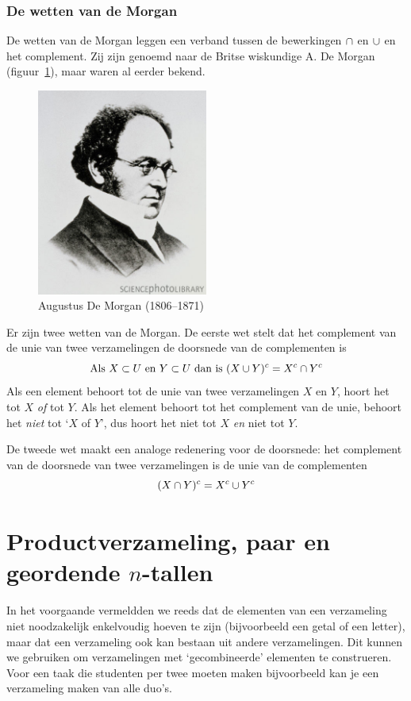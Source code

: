 \subsubsection{De wetten van de Morgan}
De wetten van de Morgan leggen een verband tussen de 
bewerkingen $\cap$ en $\cup$ en het complement. 
Zij zijn genoemd naar de Britse wiskundige A. De Morgan 
(figuur~\ref{fig:morgan}), maar waren al eerder bekend.
\begin{figure}[htbp]
\centering
\includegraphics[width=0.5\textwidth]{figuren/verzamelingen_relaties/AugustusDeMorgan}
\caption{Augustus De Morgan (1806--1871)}
\label{fig:morgan}
\end{figure}

Er zijn twee wetten van de Morgan. De eerste wet stelt dat het complement van de unie van twee verzamelingen de doorsnede van de complementen is 
\begin{equation*}
\mathrm{Als~}X\subset U \mathrm{~en~} Y\subset U \mathrm{~dan~is~}  (X\cup Y)^c=X^c \cap  Y^c 
\end{equation*}
Als een element behoort tot de unie van twee verzamelingen $X$ en $Y$, hoort het tot $X$ \emph{of} tot $Y$. Als het element behoort tot het complement van de unie, behoort het \emph{niet} tot `$X$ of $Y$', dus hoort het niet tot $X$ \emph{en} niet tot $Y$. 

De tweede wet maakt een analoge redenering voor de doorsnede:  het complement van de doorsnede van twee verzamelingen is de unie van de complementen 
\begin{equation*}
 (X\cap Y)^c=X^c \cup  Y^c
\end{equation*}

\section{Productverzameling, paar en geordende $n$-tallen}\index{\ensuremath{\times}}
\label{sec:prodverz}
In het voorgaande vermeldden we reeds dat de elementen van een verzameling niet noodzakelijk enkelvoudig hoeven te zijn (bijvoorbeeld een getal of een letter), maar dat een verzameling ook kan bestaan uit andere verzamelingen. Dit kunnen we gebruiken om verzamelingen met  `gecombineerde' elementen te construeren. Voor een taak die studenten per twee moeten maken bijvoorbeeld kan je een verzameling maken van alle duo's. 

